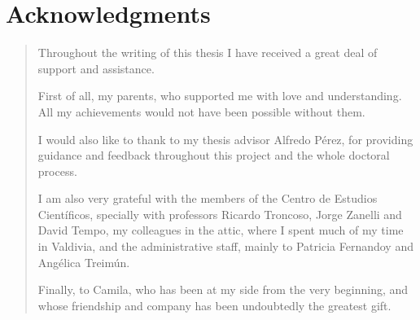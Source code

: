 \documentclass[letterpaper,11pt,oneside]{book}
\begin{document}
\chapter*{Acknowledgments}
\begin{quotation}

Throughout the writing of this thesis I have received a great deal of support and assistance.

First of all, my parents, who supported me with love and understanding. All my achievements would not have been possible without them.

I would also like to thank to my thesis advisor Alfredo Pérez, for providing guidance and feedback throughout this project and the whole doctoral process.

I am also very grateful with the members of the Centro de Estudios Científicos, specially with professors Ricardo Troncoso, Jorge Zanelli and David Tempo, my colleagues in the attic, where I spent much of my time in Valdivia, and the administrative staff, mainly to Patricia Fernandoy and Angélica Treimún.

Finally, to Camila, who has been at my side from the very beginning, and whose friendship and company has been undoubtedly the greatest gift.

\end{quotation}



\afterpage{\null\newpage}


\ \\

\newpage
\doublespacing
\end{document}
